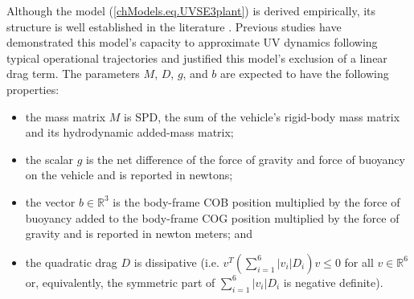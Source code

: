 Although the model (\ref{chModels.eq.UVSE3plant}) is derived
empirically, its structure is well established in the literature
\cite{fossen}.  Previous studies have demonstrated this model's
capacity to approximate \ac{UV} dynamics following typical operational
trajectories and justified this model's exclusion of a linear drag
term\cite{martinID_ICRA13}.  The parameters $M$, $D$, $g$, and $b$ are
expected to have the following properties:
\begin{itemize}
\item the mass matrix $M$ is \ac{SPD}, the sum of the vehicle's
  rigid-body mass matrix and its hydrodynamic added-mass matrix;
\item the scalar $g$ is the net difference of the
  force of gravity and force of buoyancy on the vehicle and is reported in newtons;
\item the vector $b\in\mathbb{R}^3$ is the
  body-frame \ac{COB} position multiplied by the force of buoyancy
  added to the body-frame \ac{COG} position multiplied by the force of
  gravity and is reported in newton meters; and
\item the quadratic drag $D$ is dissipative (i.e. $v^T \left(\sum_{i=1}^6
    |v_i|D_i\right)v\leq 0$ for all $v\in\mathbb{R}^6$ or,
  equivalently, the symmetric part of $\sum_{i=1}^6 |v_i|D_i$ is
  negative definite).
\end{itemize}
%

